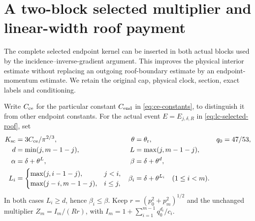 \section{A two-block selected multiplier and linear-width roof payment}
\label{sec:sc-selected-multiplier}

The complete selected endpoint kernel can be inserted in both actual
blocks used by the incidence--inverse-gradient argument.  This improves
the physical interior estimate without replacing an outgoing
roof-boundary estimate by an endpoint-momentum estimate.  We retain the
original cap, physical clock, section, exact labels and conditioning.

Write $C_{\rm ce}$ for the particular constant $C_{\rm end}$ in
\eqref{eq:ce-constants}, to distinguish it from other endpoint constants.
For the actual event $E=E_{j,\delta,R}$ in
\eqref{eq:lc-selected-roof}, set
\begin{align}
 K_{\rm sc}&=3C_{\rm ce}/\pi^{2/3},&
 \theta&=\theta_{\rm r},&q_0&=47/53,\notag\\
 d&=\min(j,m-1-j),& L&=\max(j,m-1-j),\notag\\
 \alpha&=\delta+\theta^L,&\beta&=\delta+\theta^d,
                                                   \label{eq:sc-factors}\\
 L_i&=\begin{cases}
       \max(j,i-1-j),&j<i,\\
       \max(j-i,m-1-j),&i\le j,
      \end{cases}
 &\beta_i&=\delta+\theta^{L_i}\quad(1\le i<m).
                                             \label{eq:sc-block-factors}
\end{align}
In both cases $L_i\ge d$, hence $\beta_i\le\beta$.
Keep $r=(p_0^2+p_m^2)^{1/2}$ and the unchanged multiplier
$Z_m=I_m/(Rr)$, with
$I_m=1+\sum_{i=1}^{m-1}q_0^{d_i}/c_i$.

